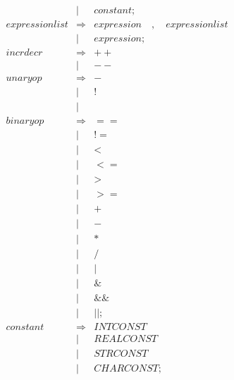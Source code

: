 \documentclass{article}
\begin{document}
\begin{eqnarray}
    & | & \mathit{constant} ; \\
    \mathit{expressionlist} & \Rightarrow & \mathit{expression}\quad \mathit{,}\quad\mathit{expressionlist}\\
    & | & \mathit{expression};\\
    \mathit{incrdecr} & \Rightarrow & \mathit{++} \\
    & | & \mathit{--}\\
    \mathit{unaryop} & \Rightarrow & \mathit{-} \\
    & | & \mathit{!}\\
    & | &\mathit{~}\\
    \mathit{binaryop} & \Rightarrow & \mathit{==} \\
    & | & \mathit{!=}\\
    & | & \mathit{<} \\
    & | & \mathit{<=}\\
    & | & \mathit{>}\\
    & | & \mathit{>=}\\
    & | & \mathit{+}\\
    & | & \mathit{-}\\
    & | & \mathit{*}\\
    & | & \mathit{/}\\
    & | & \mathit{|}\\
    & | & \mathit{\&}\\
    & | & \mathit{\&\&}\\
    & | & \mathit{||};\\
    \mathit{constant} & \Rightarrow & \mathit{INTCONST}\\
    & | &\mathit{REALCONST}\\
    & | &\mathit{STRCONST}\\
    & | &\mathit{CHARCONST};
\end{eqnarray}
\end{document}
